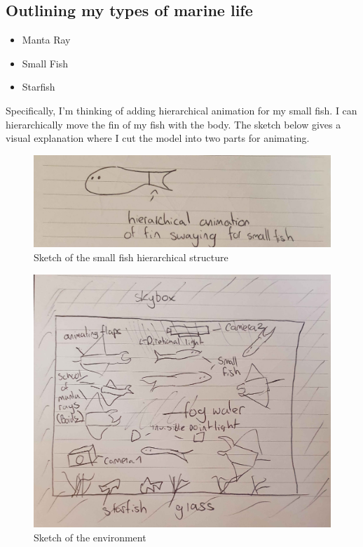 \documentclass[a4paper, 10pt]{article}
\begin{document}
\subsection{Outlining my types of marine life}
\begin{itemize}
    \item Manta Ray
    \item Small Fish
    \item Starfish
\end{itemize}
Specifically, I'm thinking of adding hierarchical animation for my small fish. I can hierarchically move the fin of my fish with the body. The sketch below gives a visual explanation where I cut the model into two parts
for animating.

\begin{figure}[h!]
    \centering
    \includegraphics[scale=0.05]{images/fish-sketch.jpg}
    \caption{Sketch of the small fish hierarchical structure}
    \label{fig:mantaray-sketch}
\end{figure}

\begin{figure}[h!]
    \centering
    \includegraphics[scale=0.1]{images/sketch.jpg}
    \caption{Sketch of the environment}
    \label{fig:environment}
\end{figure}
\end{document}
